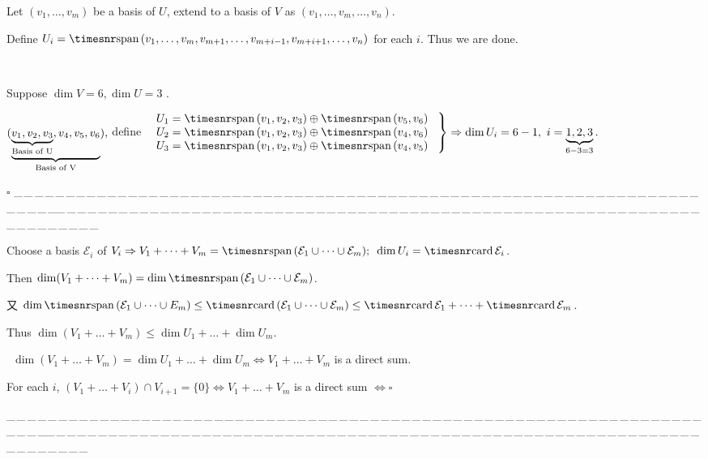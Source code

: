 \documentclass[a4paper, 11pt, UTF8]{article}
\def\card{{\timesnr\textup{card}}\,}
\def\Spn{{\timesnr\textup{span}}\,}
\def\ProblemEnding{{\tiny \_\,\_\,\_\,\_\,\_\,\_\,\_\,\_\,\_\,\_\,\_\,\_\,\_\,\_\,\_\,\_\,\_\,\_\,\_\,\_\,\_\,\_\,\_\,\_\,\_\,\_\,\_\,\_\,\_\,\_\,\_\,\_\,\_\,\_\,\_\,\_\,\_\,\_\,\_\,\_\,\_\,\_\,\_\,\_\,\_\,\_\,\_\,\_\,\_\,\_\,\_\,\_\,\_\,\_\,\_\,\_\,\_\,\_\,\_\,\_\,\_\,\_\,\_\,\_\,\_\,\_\,\_\,\_\,\_\,\_\,\_\_\,\_\,\_\,\_\,\_\,\_\,\_\,\_\,\_\,\_\,\_\,\_\,\_\,\_\,\_\,\_\,\_\,\_\,\_\,\_\,\_\,\_\,\_\,\_\,\_\,\_\,\_\,\_\,\_\,\_\,\_\,\_\,\_\,\_\,\_\,\_\,\_\,\_\,\_\,\_\,\_\,\_\,\_\,\_\,\_\,\_\,\_\,\_\,\_\,\_\,\_\,\_\,\_\,\_\,\_\,\_\,\_\,\_\,\_\,\_\,\_\,\_\,\_\,\_\,\_\,\_\,\_\,\_\,\_\,\_\,\_}}
\begin{document}
\begin{large}
Let $(v_1,\dots,v_m)$ be a basis of $U$, extend to a basis of $V$ as $(v_1,\dots,v_m,\dots,v_n)$.\par\qquad\quad\quad\quad
Define $U_i=\Spn(v_1,\dots,v_m,v_{m+1},\dots,v_{m+i-1},v_{m+i+1},\dots,v_n)$ for each $i$. Thus we are done.\par
\Example\,\,\, {\normalsize Suppose $\dim V=6,\dim U=3$ .\par\quad
$(\underbrace{\underbrace{v_1,v_2,v_3}_\textup{Basis of U},v_4,v_5,v_6}_\textup{Basis of V}),$ define $\MathRightBrace{l}{$
$U_1=\Spn(v_1,v_2,v_3)\oplus\Spn(v_5,v_6)\\ $
$U_2=\Spn(v_1,v_2,v_3)\oplus\Spn(v_4,v_6)\\ $
$U_3=\Spn(v_1,v_2,v_3)\oplus\Spn(v_4,v_5)$
$}\Rightarrow\dim U_i=6-1,\,\,i=\underbrace{1,2,3}_{6-3=3}.$}
\hfill {$\square$}\vspace{6pt}
\ProblemEnding\par

Choose a basis $ \mathcal{E}_i$ of $V_i\Rightarrow V_1+\dots+V_m=\Spn( \mathcal{E}_1\cup\cdots\cup \mathcal{E}_m);\,\,\,\dim U_i=\card \mathcal{E}_i$.\par\quad
Then $\dim(V_1+\dots+V_m)=\dim\Spn( \mathcal{E}_1\cup\cdots\cup \mathcal{E}_m)$.\par\quad
又 $\dim\Spn( \mathcal{E}_1\cup\cdots\cup E_m)\leq\card( \mathcal{E}_1\cup\cdots\cup \mathcal{E}_m)\leq\card \mathcal{E}_1+\cdots+\card \mathcal{E}_m$.\par\quad
Thus $\dim(V_1+\dots+V_m)\leq \dim U_1+\dots+\dim U_m.$\par\quad
\Comment \,\,\,$\dim(V_1+\dots+V_m)=\dim U_1+\dots+\dim U_m\Longleftrightarrow V_1+\dots+V_m$ is a direct sum.\par\qquad\qquad\qquad
For each $i$, $(V_1+\dots+V_i)\cap V_{i+1}=\{0\}\Longleftrightarrow V_1+\dots+V_m$ is a direct sum $\Longleftrightarrow\square$\par
\ProblemEnding\par


\end{large}
\end{document}
